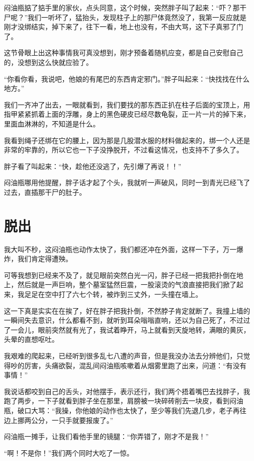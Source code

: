 闷油瓶掂了掂手里的家伙，点头同意，这个时候，突然胖子叫了起来：“吓？那干尸呢？”我们一听坏了，猛抬头，发现柱子上的那尸体竟然没了，我第一反应就是刚才没绑结实，掉下来了，往下一看，地上也没有，不由大骂，这下子真邪了门了。

这节骨眼上出这种事情我可真没想到，刚才预备着随机应变，都是自己安慰自己的，没想到这么快就应验了。

“你看你看，我说吧，他娘的有尾巴的东西肯定邪门。”胖子叫起来：“快找找在什么地方。”

我们一齐冲了出去，一眼就看到，我们要找的那东西正扒在柱子后面的宝顶上，用指甲紧紧抓着上面的浮雕，身上的黑色硬皮已经尽数龟裂，正一片一片的掉下来，里面血淋淋的，不知道是什么。

我看到绳子还绑在它的腰上，因为那是几股潜水服的材料做起来的，绑一个人还是非常的牢靠的，所以它也一下子没挣脱开，不过看这情况，也支持不了多久了。

胖子看了叫起来：“快，趁他还没逃了，先引爆了再说！！”

闷油瓶哪用他提醒，胖子话才起了个头，我就听一声破风，同时一到青光已经飞了过去，直插那干尸的肚子。

\chapter{脱出}

我大叫不秒，这闷油瓶也动作太快了，我们都还冲在外面，这样一下子，万一爆炸，我们肯定得遭殃。

可等我想到已经来不及了，就见眼前突然白光一闪，胖子已经一把我把扑倒在地上，然后就是一声巨响，整个墓室猛然巨震，一股滚烫的气浪直接把我们掀了起来，我足足在空中打了六七个转，被炸到三丈外，一头撞在墙上。

这一下真是实实在在挨了，好在胖子把我扑倒，不然脖子肯定就断了。我撞上墙的一瞬间失去意识，什么都看不到，就听到耳朵嗡嗡直响，还以为自己死了，不过过了一会儿，眼前突然就有光了，我试着睁开，马上就看到天旋地转，满眼的黄灰，头晕的直想呕吐。

我艰难的爬起来，已经听到很多乱七八遭的声音，但是我没办法去分辨他们，只觉得吵的厉害，头痛欲裂，混乱间闷油瓶咳嗽着从烟雾里跑了出来，问道：“有没有事情！”

我说话都咬到自己的舌头，对他摆手，表示还行，我们两个捂着嘴巴去找胖子，我跑了两步，一下子就看到胖子坐在那里，肩膀被一块碎砖削去一块皮，看到闷油瓶，破口大骂：“我操，你他娘的动作也太快了，至少等我们先退几步，老子再往边上挪两公分，一只手就要报废了。”

闷油瓶一摊手，让我们看他手里的镜腿：“你弄错了，刚才不是我！”

“啊！不是你！”我们两个同时大吃了一惊。

